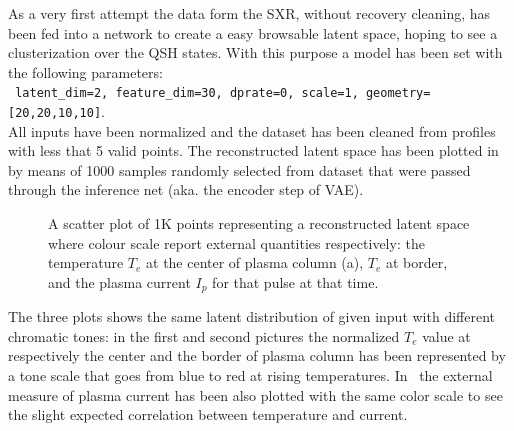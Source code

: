 As a very first attempt the data form the SXR, without recovery cleaning, has been fed into a  network to create a easy browsable latent space, hoping to see a clusterization over the QSH states.
With this purpose a  model has been set with the following parameters: \\
\verb| latent_dim=2, feature_dim=30, dprate=0, scale=1, geometry=[20,20,10,10]|. \\
All inputs have been normalized and the dataset has been cleaned from profiles with less that 5 valid points.
The reconstructed latent space has been plotted in~\Figure{\ref{fig:VAE2_qsh_ls}} by means of 1000 samples randomly selected from dataset that were passed through the inference net (aka. the encoder step of VAE).
\begin{figure}
    \centering
    \caption{A scatter plot of 1K points representing a reconstructed  latent space where colour scale report external quantities respectively: the temperature $T_e$ at the center of plasma column (a), $T_e$ at border, and the plasma current $I_p$ for that pulse at that time. }
    \label{fig:VAE2_qsh_ls}
\end{figure}
The three plots shows the same latent distribution of given input with different chromatic tones: in the first and second pictures the normalized $T_e$ value at respectively the center and the border of plasma column has been represented by a tone scale that goes from blue to red at rising temperatures. In~\Figure{\ref{fig:VAE2_qsh_ls_c}} the external measure of plasma current has been also plotted with the same color scale to see the slight expected correlation between temperature and current.

